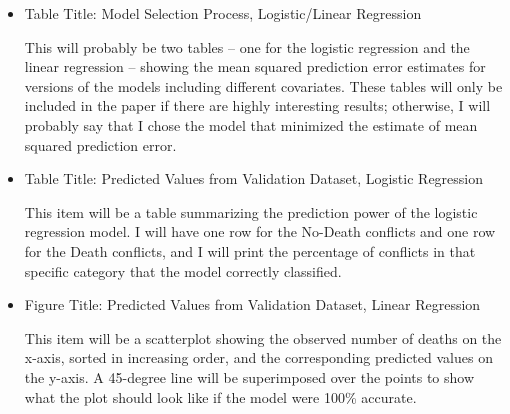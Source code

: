 \documentclass{article}
\begin{document}
\begin{itemize}
\item Table Title: Model Selection Process, Logistic/Linear Regression

This will probably be two tables -- one for the logistic regression and the linear regression -- showing the mean squared prediction error estimates for versions of the models including different covariates.  These tables will only be included in the paper if there are highly interesting results; otherwise, I will probably say that I chose the model that minimized the estimate of mean squared prediction error.

\item Table Title: Predicted Values from Validation Dataset, Logistic Regression

This item will be a table summarizing the prediction power of the logistic regression model.  I will have one row for the No-Death conflicts and one row for the Death conflicts, and I will print the percentage of conflicts in that specific category that the model correctly classified.

\item Figure Title: Predicted Values from Validation Dataset, Linear Regression

This item will be a scatterplot showing the observed number of deaths on the x-axis, sorted in increasing order, and the corresponding predicted values on the y-axis.  A 45-degree line will be superimposed over the points to show what the plot should look like if the model were 100\% accurate.
\end{itemize}
\end{document}
